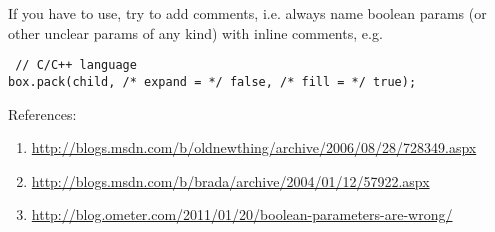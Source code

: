 If you have to use, try to add comments, i.e.
always name boolean params (or other unclear params of any kind) with inline
comments, e.g.
\begin{verbatim}
 // C/C++ language
box.pack(child, /* expand = */ false, /* fill = */ true);
\end{verbatim}

References:
\begin{enumerate}
  \item \url{http://blogs.msdn.com/b/oldnewthing/archive/2006/08/28/728349.aspx}
  
  \item \url{http://blogs.msdn.com/b/brada/archive/2004/01/12/57922.aspx}
  
  \item \url{http://blog.ometer.com/2011/01/20/boolean-parameters-are-wrong/}
\end{enumerate}


